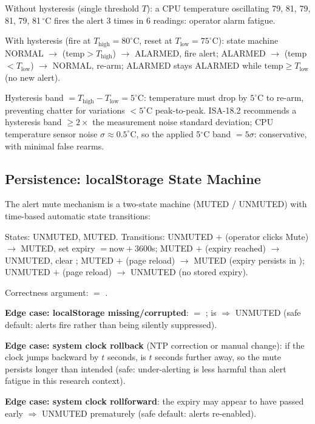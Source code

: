 \begin{eqblock}
Without hysteresis (single threshold $T$): a CPU temperature oscillating 79, 81, 79, 81, 79, 81\,$^\circ$C fires the alert 3 times in 6 readings: operator alarm fatigue.

With hysteresis (fire at $T_{\text{high}}=80^\circ$C, reset at $T_{\text{low}}=75^\circ$C): state machine NORMAL $\to$ (temp$>T_{\text{high}}$) $\to$ ALARMED, fire alert; ALARMED $\to$ (temp$<T_{\text{low}}$) $\to$ NORMAL, re-arm; ALARMED stays ALARMED while $\text{temp}\geq T_{\text{low}}$ (no new alert).

Hysteresis band $=T_{\text{high}}-T_{\text{low}}=5^\circ$C: temperature must drop by $5^\circ$C to re-arm, preventing chatter for variations $<5^\circ$C peak-to-peak. ISA-18.2 recommends a hysteresis band $\geq2\times$ the measurement noise standard deviation; CPU temperature sensor noise $\sigma\approx0.5^\circ$C, so the applied 5$^\circ$C band $=5\sigma$: conservative, with minimal false rearms.
\end{eqblock}

\subsection{ Persistence: localStorage State Machine}

The alert mute mechanism is a two-state machine (MUTED / UNMUTED) with time-based automatic state transitions:

\begin{eqblock}
States: UNMUTED, MUTED. Transitions: UNMUTED $+$ (operator clicks Mute) $\to$ MUTED, set expiry $=\text{now}+3600$s; MUTED $+$ (expiry reached) $\to$ UNMUTED, clear ; MUTED $+$ (page reload) $\to$ MUTED (expiry persists in ); UNMUTED $+$ (page reload) $\to$ UNMUTED (no stored expiry).

Correctness argument:  $=$ .

\textbf{Edge case: localStorage missing/corrupted}:  $=$ ;  is  $\Rightarrow$ UNMUTED (safe default: alerts fire rather than being silently suppressed).

\textbf{Edge case: system clock rollback} (NTP correction or manual change): if the clock jumps backward by $t$ seconds,  is $t$ seconds further away, so the mute persists longer than intended (safe: under-alerting is less harmful than alert fatigue in this research context).

\textbf{Edge case: system clock rollforward}: the expiry may appear to have passed early $\Rightarrow$ UNMUTED prematurely (safe default: alerts re-enabled).
\end{eqblock}

